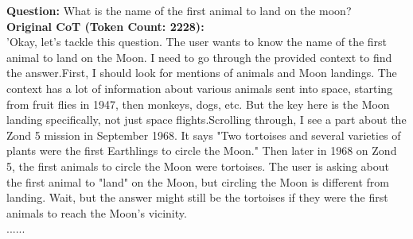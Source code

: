 \begin{figure*}[ht!]
    \centering
    \begin{tcolorbox}[
        enhanced,                  %
        colframe=green!50!black,   %
        colback=green!5,           %
        coltitle=white,            %
        colbacktitle=green!50!black, %
        width=\textwidth,          %
        arc=4mm,                   %
        boxrule=1mm,               %
        drop shadow,               %
        title=Example Reasoning Tokens, %
        fonttitle=\bfseries\large  %
    ]

    \textbf{Question:} What is the name of the first animal to land on the moon? \\
    
    \textbf{Original CoT (Token Count: 2228):}\\
    'Okay, let's tackle this question. The user wants to know the name of the first animal to land on the Moon. I need to go through the provided context to find the answer.First, I should look for mentions of animals and Moon landings. The context has a lot of information about various animals sent into space, starting from fruit flies in 1947, then monkeys, dogs, etc. But the key here is the Moon landing specifically, not just space flights.Scrolling through, I see a part about the Zond 5 mission in September 1968. It says "Two tortoises and several varieties of plants were the first Earthlings to circle the Moon." Then later in 1968 on Zond 5, the first animals to circle the Moon were tortoises. The user is asking about the first animal to "land" on the Moon, but circling the Moon is different from landing. Wait, but the answer might still be the tortoises if they were the first animals to reach the Moon's vicinity. \\
    ......
    \\
    

\end{tcolorbox}
\end{figure*}

